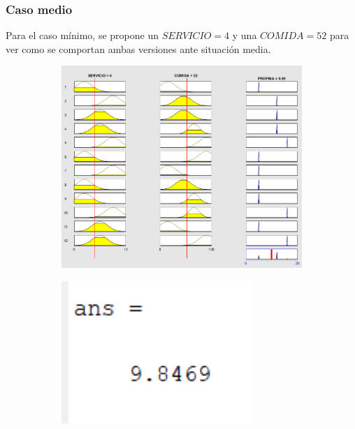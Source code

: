 \documentclass[11pt, letterpaper]{article}
\begin{document}
\newpage

\subsubsection{Caso medio}
Para el caso mínimo, se propone un $SERVICIO = 4$ y una $COMIDA = 52$ para ver como se comportan ambas versiones ante situación media.

\begin{figure}[h]
	\centering
	\begin{subfigure}{0.40\textwidth} %
		\centering
		\includegraphics[width=1.4\textwidth]{IMG/RP12.png}
		\label{fig:G5}
	\end{subfigure}
	\hfill
	\begin{subfigure}{0.42\textwidth} %
		\centering
		\includegraphics[width=0.8\textwidth]{IMG/M12.png}
		\label{fig:G6}
	\end{subfigure}
	\label{fig:comparacion3}
\end{figure}
\end{document}
